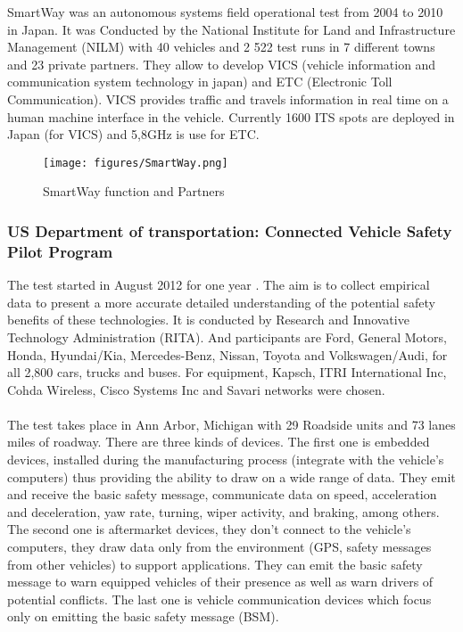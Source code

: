 \documentclass[a4paper]{article}
\begin{document}
SmartWay \cite{SmartWay} was an autonomous systems field operational test from 2004 to 2010 in Japan. It was Conducted by the National Institute for Land and Infrastructure Management (NILM) with 40 vehicles and 2 522 test runs in 7 different towns and 23 private partners. They allow to develop VICS (vehicle information and communication system technology in japan) and ETC (Electronic Toll Communication). VICS provides traffic and travels information in real time on a human machine interface in the vehicle. Currently 1600 ITS spots are deployed in Japan (for VICS) and 5,8GHz is use for ETC. 
\begin{figure}[!htb]
\begin{center}
\texttt{[image: figures/SmartWay.png]}
\caption{SmartWay function and Partners}
\end{center}
\end{figure}

\subsubsection{US Department of transportation: Connected Vehicle Safety Pilot Program}
\label{SafetyPilot}

The test started in August 2012 for one year \cite{USSafetyPilot}. The aim is to collect empirical data to present a more accurate detailed understanding of the potential safety benefits of these technologies. It is conducted by Research and Innovative Technology Administration (RITA). And participants are Ford, General Motors, Honda, Hyundai/Kia, Mercedes-Benz, Nissan, Toyota and Volkswagen/Audi, for all 2,800 cars, trucks and buses. For equipment, Kapsch, ITRI International Inc, Cohda Wireless, Cisco Systems Inc and Savari networks were chosen.\\

\paragraph{}The test takes place in Ann Arbor, Michigan with 29 Roadside units and 73 lanes miles of roadway. There are three kinds of devices. The first one is embedded devices, installed during the manufacturing process (integrate with the vehicle's computers) thus providing the ability to draw on a wide range of data. They emit and receive the basic safety message, communicate data on speed, acceleration and deceleration, yaw rate, turning, wiper activity, and braking, among others. The second one is aftermarket devices, they don't connect to the vehicle's computers, they draw data only from the environment (GPS, safety messages from other vehicles) to support applications. They can emit the basic safety message to warn equipped vehicles of their presence as well as warn drivers of potential conflicts. The last one is vehicle communication devices which focus only on emitting the basic safety message (BSM).\\
\end{document}
